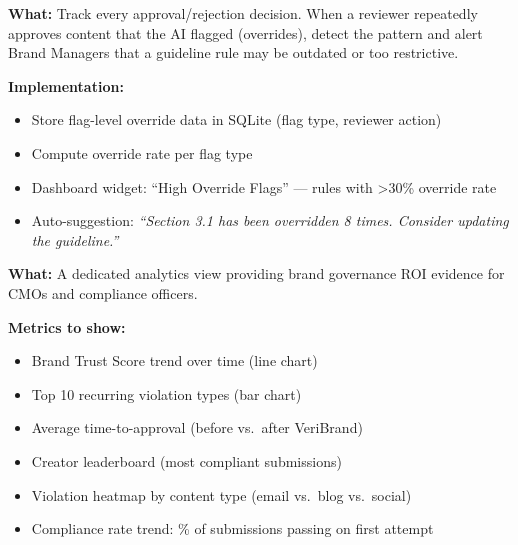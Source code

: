 \documentclass[11pt,a4paper]{article}
\begin{document}
\vspace{0.5cm}

\begin{tcolorbox}[colback=primaryblue!10, colframe=primaryblue, arc=2mm, boxrule=0.5pt, title=\textbf{Improvement 2: Living Guideline Feedback Loop}]
\textbf{What:} Track every approval/rejection decision. When a reviewer repeatedly approves content that the AI flagged (overrides), detect the pattern and alert Brand Managers that a guideline rule may be outdated or too restrictive.

\textbf{Implementation:}
\begin{itemize}[nosep]
    \item Store flag-level override data in SQLite (flag type, reviewer action)
    \item Compute override rate per flag type
    \item Dashboard widget: ``High Override Flags'' --- rules with \textgreater 30\% override rate
    \item Auto-suggestion: \textit{``Section 3.1 has been overridden 8 times. Consider updating the guideline.''}
\end{itemize}
\end{tcolorbox}

\vspace{0.5cm}

\begin{tcolorbox}[colback=primaryblue!10, colframe=primaryblue, arc=2mm, boxrule=0.5pt, title=\textbf{Improvement 3: Leadership Analytics Dashboard}]
\textbf{What:} A dedicated analytics view providing brand governance ROI evidence for CMOs and compliance officers.

\textbf{Metrics to show:}
\begin{itemize}[nosep]
    \item Brand Trust Score trend over time (line chart)
    \item Top 10 recurring violation types (bar chart)
    \item Average time-to-approval (before vs.\ after VeriBrand)
    \item Creator leaderboard (most compliant submissions)
    \item Violation heatmap by content type (email vs.\ blog vs.\ social)
    \item Compliance rate trend: \% of submissions passing on first attempt
\end{itemize}
\end{tcolorbox}
\end{document}
